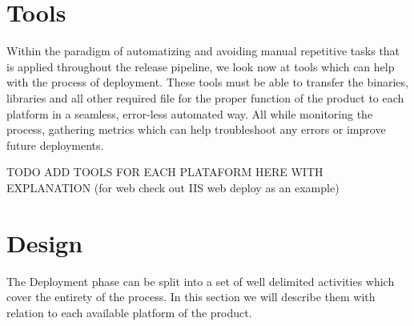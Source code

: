\documentclass[12pt]{report}
\begin{document}
\section{Tools}
Within the paradigm of automatizing and avoiding manual repetitive tasks that is applied throughout the release pipeline, we look now at tools which can help with the process of deployment. These tools must be able to transfer the binaries, libraries and all other required file for the proper function of the product to each platform in a seamless, error-less automated way. All while monitoring the process, gathering metrics which can help troubleshoot any errors or improve future deployments.

TODO ADD TOOLS FOR EACH PLATAFORM HERE WITH EXPLANATION (for web check out IIS web deploy as an example)

\section{Design}
The Deployment phase can be split into a set of well delimited activities which cover the entirety of the process. In this section we will describe them with relation to each available platform of the product.
\end{document}
